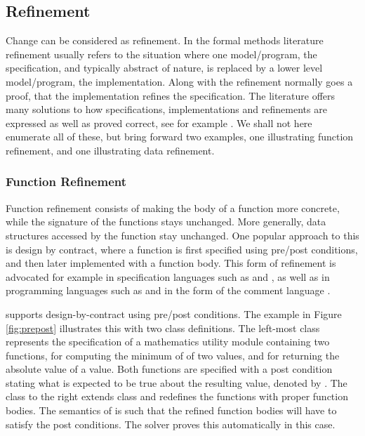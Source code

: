 \subsection{Refinement}

Change can be considered as refinement. In the formal methods literature
refinement usually refers to the situation where one model/program, the specification, and typically abstract of nature, is replaced by a lower 
level model/program, the implementation. Along with the refinement normally
goes a proof, that the implementation refines the specification.
The literature offers many solutions to how specifications, implementations and refinements are expressed as well as proved correct, see for example \cite{vdm,raise}. We shall not here enumerate all of these, but bring forward two examples, one illustrating function refinement, and one illustrating data refinement.

\subsubsection{Function Refinement}

Function refinement consists of making the body of a function more concrete,
while the signature of the functions stays unchanged. More generally, data 
structures accessed by the function stay unchanged. One popular approach to this
is design by contract, where a function is first specified using pre/post conditions, and then later implemented with a function body. This form of refinement is advocated for example in specification languages such as 
\vdm{} \cite{vdm} and \raiselang{} \cite{raise}, as well as in programming
languages such as \eiffel{} \cite{eiffel} and \java{} in the form of the \jml{}
comment language \cite{jml}. 

\Klang{} supports design-by-contract using pre/post conditions. The example in
Figure \ref{fig:prepost} illustrates this with two class definitions. The left-most
class  represents the specification of a mathematics utility module containing two functions,  for computing the minimum of of
two values, and  for returning the absolute value of a value. Both functions are specified with a post condition stating what is expected to be true
about the resulting value, denoted by . The class 
to the right extends class  and redefines the functions with
proper function bodies. The semantics of \Klang{} is such that the refined function bodies will have to satisfy the post conditions. The \Klang{} solver proves this
automatically in this case.

